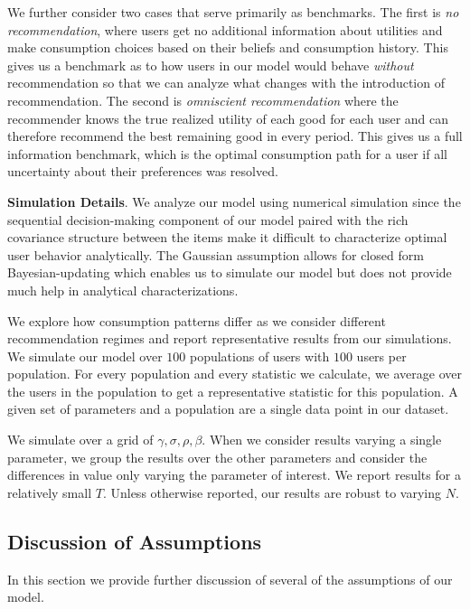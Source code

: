 \documentclass[sigconf]{acmart}
\begin{document}
We further consider two cases that serve primarily as benchmarks. The first is \textit{no recommendation}, where users get no additional information about utilities and make consumption choices based on their beliefs and consumption history. This gives us a benchmark as to how users in our model would behave \textit{without} recommendation so that we can analyze what changes with the introduction of recommendation. The second is \textit{omniscient recommendation} where the recommender knows the true realized utility of each good for each user and can therefore recommend the best remaining good in every period. This gives us a full information benchmark, which is the optimal consumption path for a user if all uncertainty about their preferences was resolved.
\par
\noindent \textbf{Simulation Details}. We analyze our model using numerical simulation since the sequential decision-making component of our model paired with the rich covariance structure between the items make it difficult to characterize optimal user behavior analytically. The Gaussian assumption allows for closed form Bayesian-updating which enables us to simulate our model but does not provide much help in analytical characterizations.

We explore how consumption patterns differ as we consider different recommendation regimes and report representative results from our simulations. We simulate our model over $100$ populations of users with $100$ users per population. For every population and every statistic we calculate, we average over the users in the population to get a representative statistic for this population. A given set of parameters and a population are a single data point in our dataset.

We simulate over a grid of $\gamma, \sigma, \rho, \beta$. When we consider results varying a single parameter, we group the results over the other parameters and consider the differences in value only varying the parameter of interest. We report results for a relatively small $T$. Unless otherwise reported, our results are robust to varying $N$.

\subsection{Discussion of Assumptions}

In this section we provide further discussion of several of the assumptions of our model.
\end{document}
